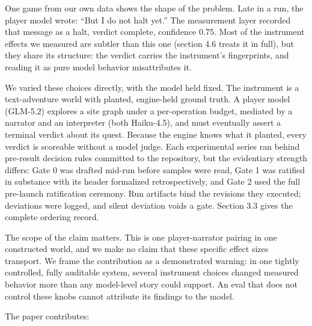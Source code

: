 \documentclass[11pt]{article}
\begin{document}
One game from our own data shows the shape of the problem. Late in a
run, the player model wrote: ``But I do not halt yet.'' The measurement
layer recorded that message as a halt, verdict complete, confidence
0.75. Most of the instrument effects we measured are subtler than this
one (section 4.6 treats it in full), but they share its structure: the
verdict carries the instrument's fingerprints, and reading it as pure
model behavior misattributes it.

We varied these choices directly, with the model held fixed. The
instrument is a text-adventure world with planted, engine-held ground
truth. A player model (GLM-5.2) explores a site graph under a
per-operation budget, mediated by a narrator and an interpreter (both
Haiku-4.5), and must eventually assert a terminal verdict about its
quest. Because the engine knows what it planted, every verdict is
scoreable without a model judge. Each experimental series ran behind
pre-result decision rules committed to the repository, but the
evidentiary strength differs: Gate 0 was drafted mid-run before samples
were read, Gate 1 was ratified in substance with its header formalized
retrospectively, and Gate 2 used the full pre-launch ratification
ceremony. Run artifacts bind the revisions they executed; deviations
were logged, and silent deviation voids a gate. Section 3.3 gives the
complete ordering record.

The scope of the claim matters. This is one player-narrator pairing in
one constructed world, and we make no claim that these specific effect
sizes transport. We frame the contribution as a demonstrated warning: in
one tightly controlled, fully auditable system, several instrument
choices changed measured behavior more than any model-level story could
support. An eval that does not control these knobs cannot attribute its
findings to the model.

The paper contributes:
\end{document}
